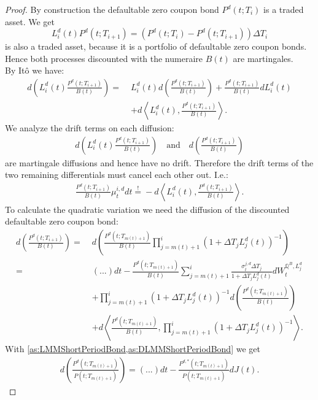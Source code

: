 \documentclass[12pt]{article}
\newcommand{\mbeq}{\overset{!}{=}}
\begin{document}
	\begin{proof}
		By construction the defaultable zero coupon bond $P^d(t; T_i)$ is a traded asset.
		We get 
		\[
			L^d_i(t)P^d(t;T_{i+1}) = (P^{d}(t;T_i) - P^{d}(t;T_{i+1}))\Delta T_i
		\]
		is also a traded asset, because it is a portfolio of defaultable zero coupon bonds. Hence both processes discounted with the numeraire $B(t)$ are martingales.\\
		By Itô we have:
		\begin{align*}
			d\left(L_i^d(t)\frac{P^d(t;T_{i+1})}{B(t)}\right) = \; &L_i^d(t) d\left(\frac{P^d(t;T_{i+1})}{B(t)}\right) +  \frac{P^d(t;T_{i+1})}{B(t)}dL_i^d(t) \\
			&+ d \left\langle  L_i^d(t), \frac{P^d(t;T_{i+1})}{B(t)} \right\rangle.
		\end{align*}
		We analyze the drift terms on each diffusion:
		\begin{align*}
			d\left(L_i^d(t)\frac{P^d(t;T_{i+1})}{B(t)}\right) 
			\quad \text{and}\quad 
			d\left(\frac{P^d(t;T_{i+1})}{B(t)}\right)
		\end{align*} 
		are martingale diffusions and hence have no drift.
		Therefore the drift terms of the two remaining differentials must cancel each other out. I.e.:
		\begin{align}\label{defDriftDeriv}
			\frac{P^d(t;T_{i+1})}{B(t)} \mu^{i, d}_t dt \mbeq - d \left\langle  L_i^d(t), \frac{P^d(t;T_{i+1})}{B(t)} \right\rangle.
		\end{align}
		To calculate the quadratic variation we need the diffusion of the discounted defaultable zero coupon bond:
		\begin{align*}
			d\left(\frac{P^d(t;T_{i+1})}{B(t)}\right) = \;&
			d\left(\frac{P^d(t;T_{m(t)+1})}{B(t)} \prod_{j=m(t)+1}^{i}(1+\Delta T_j L^d_j(t))^{-1}\right)\\
			 = \;& (...)dt - \frac{P^d(t;T_{m(t)+1})}{B(t)} \sum_{j=m(t)+1}^{i}\frac{ \sigma^{j, d}_t \Delta T_j}{1 + \Delta T_j L^d_j(t)} dW^{\mathbb{Q}^B, L^d_j}_t \\
			 & + \prod_{j=m(t)+1}^{i}(1+\Delta T_j L^d_j(t))^{-1} d\left(\frac{P^d(t;T_{m(t)+1})}{B(t)}\right)\\
			 & + d\left\langle\frac{P^d(t;T_{m(t)+1})}{B(t)}, \prod_{j=m(t)+1}^{i}(1+\Delta T_j L^d_j(t))^{-1}\right\rangle.
		\end{align*}
		With \cref{as:LMMShortPeriodBond,as:DLMMShortPeriodBond} we get 
		\begin{align*}
			d\left(\frac{P^d(t;T_{m(t)+1})}{P(t;T_{m(t)+1})}\right) = (...)dt - \frac{P^{d,*}(t;T_{m(t)+1})}{P(t;T_{m(t)+1})}dJ(t).

\end{align*}
\end{proof}
\end{document}
